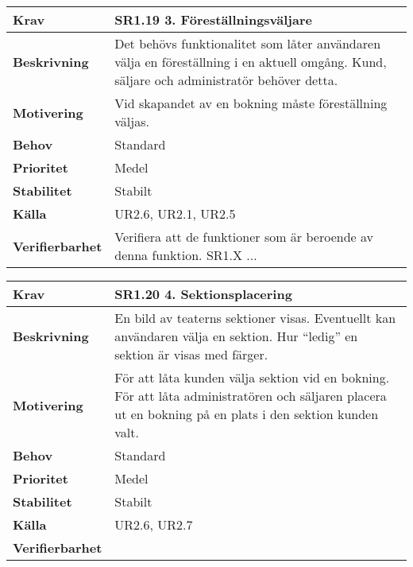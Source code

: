 \documentclass[a4paper, twoside, 11pt, titlepage]{article}
\begin{document}
	\begin{tabular} { p{2.6cm} p{12.5cm} }
		\hline
		\sffamily\textbf{Krav} & \sffamily\textbf{SR1.19 3. Föreställningsväljare } \\
		\hline
		\sffamily\textbf{Beskrivning} & Det behövs funktionalitet som låter användaren välja en föreställning i en aktuell omgång. Kund, säljare och administratör behöver detta.  \\
		\hline
		\sffamily\textbf{Motivering} & Vid skapandet av en bokning måste föreställning väljas.  \\
		\hline
		\sffamily\textbf{Behov} & Standard  \\
		\hline
		\sffamily\textbf{Prioritet} & Medel  \\
		\hline
		\sffamily\textbf{Stabilitet} & Stabilt  \\
		\hline
		\sffamily\textbf{Källa} & UR2.6, UR2.1, UR2.5  \\
		\hline
		\sffamily\textbf{Verifierbarhet} & Verifiera att de funktioner som är beroende av denna funktion. SR1.X ...  \\
		\hline
	\end{tabular}
	\vspace{6mm}

	\begin{tabular} { p{2.6cm} p{12.5cm} }
		\hline
		\sffamily\textbf{Krav} & \sffamily\textbf{SR1.20 4. Sektionsplacering } \\
		\hline
		\sffamily\textbf{Beskrivning} & En bild av teaterns sektioner visas. Eventuellt kan användaren välja en sektion. Hur ``ledig'' en sektion är visas med färger.  \\
		\hline
		\sffamily\textbf{Motivering} & För att låta kunden välja sektion vid en bokning. För att låta administratören och säljaren placera ut en bokning på en plats i den sektion kunden valt.  \\
		\hline
		\sffamily\textbf{Behov} & Standard  \\
		\hline
		\sffamily\textbf{Prioritet} & Medel  \\
		\hline
		\sffamily\textbf{Stabilitet} & Stabilt  \\
		\hline
		\sffamily\textbf{Källa} & UR2.6, UR2.7  \\
		\hline
		\sffamily\textbf{Verifierbarhet} &   \\
		\hline
	\end{tabular}
	\vspace{6mm}
\end{document}
